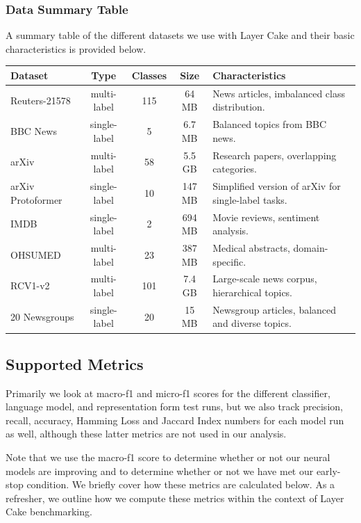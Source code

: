 \documentclass[final]{clv2025}
\begin{document}
\subsubsection{Data Summary Table}
A summary table of the different datasets we use with Layer Cake and their basic characteristics is provided below.
\sloppy
\begin{table}[h!]

\label{tab1}
\begin{tabularx}{\textwidth}{l c c c X}
\toprule
\textbf{Dataset} & \textbf{Type} & \textbf{Classes} & \textbf{Size} & \textbf{Characteristics} \\
\midrule
Reuters-21578 & multi-label & 115 & 64 MB & News articles, imbalanced class distribution. \\
BBC News & single-label & 5 & 6.7 MB & Balanced topics from BBC news. \\
arXiv & multi-label & 58 & 5.5 GB & Research papers, overlapping categories. \\
arXiv Protoformer & single-label & 10 & 147 MB & Simplified version of arXiv for single-label tasks. \\
IMDB & single-label & 2 & 694 MB & Movie reviews, sentiment analysis. \\
OHSUMED & multi-label & 23 & 387 MB & Medical abstracts, domain-specific. \\
RCV1-v2 & multi-label & 101 & 7.4 GB & Large-scale news corpus, hierarchical topics. \\
20 Newsgroups & single-label & 20 & 15 MB & Newsgroup articles, balanced and diverse topics. \\

\bottomrule
\end{tabularx}
\end{table}
\subsection{Supported Metrics}
Primarily we look at macro-f1 and micro-f1 scores for the different classifier, language model, and representation form test runs, but we also track precision, recall, accuracy, Hamming Loss and Jaccard Index numbers for each model run as well, although these latter metrics are not used in our analysis. 

Note that we use the macro-f1 score to determine whether or not our neural models are improving and to determine whether or not we have met our early-stop condition. We briefly cover how these metrics are calculated below. As a refresher, we outline how we compute these metrics within the context of Layer Cake benchmarking.
\end{document}

